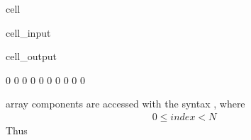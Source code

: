 \documentclass[a4paper,10pt,english]{jupyterBook}
\begin{document}
\begin{sphinxuseclass}{cell}\begin{sphinxVerbatimInput}

\begin{sphinxuseclass}{cell_input}
\begin{sphinxVerbatim}[commandchars=\\\{\}]
\PYG{p}{[}\PYG{p}{]}
\end{sphinxVerbatim}

\end{sphinxuseclass}\end{sphinxVerbatimInput}
\begin{sphinxVerbatimOutput}

\begin{sphinxuseclass}{cell_output}
\begin{sphinxVerbatim}[commandchars=\\\{\}]
0 0 0 0 0 0 0 0 0 0 
\end{sphinxVerbatim}

\end{sphinxuseclass}\end{sphinxVerbatimOutput}

\end{sphinxuseclass}
\sphinxAtStartPar
array components are accessed with the syntax , where
\begin{equation*}
\begin{split}
0 \leq index <N
\end{split}
\end{equation*}
\sphinxAtStartPar
Thus
\end{document}
